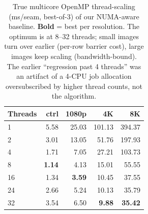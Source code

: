 \begin{table}[h!]
\caption{True multicore OpenMP thread-scaling (ms/seam, best-of-3) of our
NUMA-aware baseline. \textbf{Bold} = best per resolution. The optimum is at
8--32 threads; small images turn over earlier (per-row barrier cost), large
images keep scaling (bandwidth-bound). The earlier ``regression past 4 threads''
was an artifact of a 4-CPU job allocation oversubscribed by higher thread
counts, not the algorithm.}
\label{tab:omp}
\centering
\begin{tabular}{@{}lrrrr@{}}
\toprule
\textbf{Threads} & \textbf{ctrl} & \textbf{1080p} & \textbf{4K} & \textbf{8K} \\
\midrule
1  & 5.58 & 25.03 & 101.13 & 394.37 \\
2  & 3.01 & 13.05 & 51.76  & 197.93 \\
4  & 1.71 & 7.05  & 27.21  & 103.73 \\
8  & \textbf{1.14} & 4.13 & 15.01 & 55.55 \\
16 & 1.34 & \textbf{3.59} & 10.45 & 37.55 \\
24 & 2.66 & 5.24 & 10.13 & 35.79 \\
32 & 3.54 & 6.50 & \textbf{9.88} & \textbf{35.42} \\
\bottomrule
\end{tabular}
\end{table}
